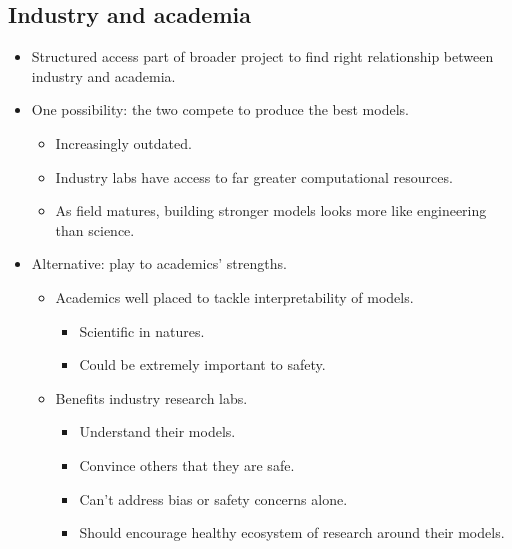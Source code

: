 \subsection{Industry and academia}

\begin{itemize}
    \item Structured access part of broader project to find right relationship between industry and academia.
    \item One possibility: the two compete to produce the best models.
    \begin{itemize}
        \item Increasingly outdated.
        \item Industry labs have access to far greater computational resources.
        \item As field matures, building stronger models looks more like engineering than science.
    \end{itemize}
    \item Alternative: play to academics' strengths.
    \begin{itemize}
        \item Academics well placed to tackle interpretability of models.
        \begin{itemize}
            \item Scientific in natures.
            \item Could be extremely important to safety.
        \end{itemize}
        \item Benefits industry research labs.
        \begin{itemize}
            \item Understand their models.
            \item Convince others that they are safe.
            \item Can't address bias or safety concerns alone.
            \item Should encourage healthy ecosystem of research around their models.
        \end{itemize}
    \end{itemize}
\end{itemize}